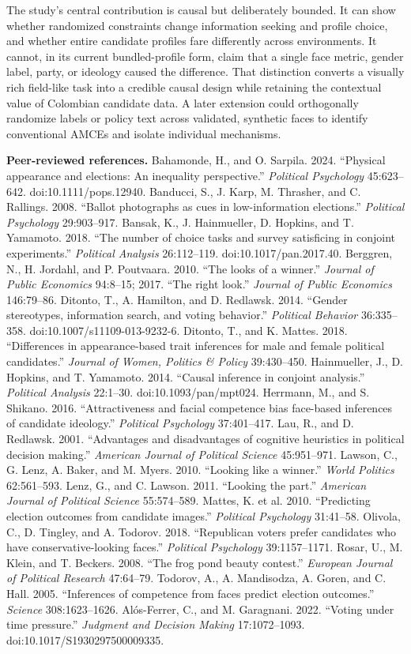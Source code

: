 \documentclass[10pt]{article}
\begin{document}
The study's central contribution is causal but deliberately bounded. It can show whether randomized constraints change information seeking and profile choice, and whether entire candidate profiles fare differently across environments. It cannot, in its current bundled-profile form, claim that a single face metric, gender label, party, or ideology caused the difference. That distinction converts a visually rich field-like task into a credible causal design while retaining the contextual value of Colombian candidate data. A later extension could orthogonally randomize labels or policy text across validated, synthetic faces to identify conventional AMCEs and isolate individual mechanisms.

\vspace{2pt}
{\footnotesize
\textbf{Peer-reviewed references.}
Bahamonde, H., and O. Sarpila. 2024. ``Physical appearance and elections: An inequality perspective.'' \emph{Political Psychology} 45:623--642. doi:10.1111/pops.12940.
Banducci, S., J. Karp, M. Thrasher, and C. Rallings. 2008. ``Ballot photographs as cues in low-information elections.'' \emph{Political Psychology} 29:903--917.
Bansak, K., J. Hainmueller, D. Hopkins, and T. Yamamoto. 2018. ``The number of choice tasks and survey satisficing in conjoint experiments.'' \emph{Political Analysis} 26:112--119. doi:10.1017/pan.2017.40.
Berggren, N., H. Jordahl, and P. Poutvaara. 2010. ``The looks of a winner.'' \emph{Journal of Public Economics} 94:8--15; 2017. ``The right look.'' \emph{Journal of Public Economics} 146:79--86.
Ditonto, T., A. Hamilton, and D. Redlawsk. 2014. ``Gender stereotypes, information search, and voting behavior.'' \emph{Political Behavior} 36:335--358. doi:10.1007/s11109-013-9232-6.
Ditonto, T., and K. Mattes. 2018. ``Differences in appearance-based trait inferences for male and female political candidates.'' \emph{Journal of Women, Politics \& Policy} 39:430--450.
Hainmueller, J., D. Hopkins, and T. Yamamoto. 2014. ``Causal inference in conjoint analysis.'' \emph{Political Analysis} 22:1--30. doi:10.1093/pan/mpt024.
Herrmann, M., and S. Shikano. 2016. ``Attractiveness and facial competence bias face-based inferences of candidate ideology.'' \emph{Political Psychology} 37:401--417.
Lau, R., and D. Redlawsk. 2001. ``Advantages and disadvantages of cognitive heuristics in political decision making.'' \emph{American Journal of Political Science} 45:951--971.
Lawson, C., G. Lenz, A. Baker, and M. Myers. 2010. ``Looking like a winner.'' \emph{World Politics} 62:561--593.
Lenz, G., and C. Lawson. 2011. ``Looking the part.'' \emph{American Journal of Political Science} 55:574--589.
Mattes, K. et al. 2010. ``Predicting election outcomes from candidate images.'' \emph{Political Psychology} 31:41--58.
Olivola, C., D. Tingley, and A. Todorov. 2018. ``Republican voters prefer candidates who have conservative-looking faces.'' \emph{Political Psychology} 39:1157--1171.
Rosar, U., M. Klein, and T. Beckers. 2008. ``The frog pond beauty contest.'' \emph{European Journal of Political Research} 47:64--79.
Todorov, A., A. Mandisodza, A. Goren, and C. Hall. 2005. ``Inferences of competence from faces predict election outcomes.'' \emph{Science} 308:1623--1626.
Al\'os-Ferrer, C., and M. Garagnani. 2022. ``Voting under time pressure.'' \emph{Judgment and Decision Making} 17:1072--1093. doi:10.1017/S1930297500009335.
}
\end{document}
